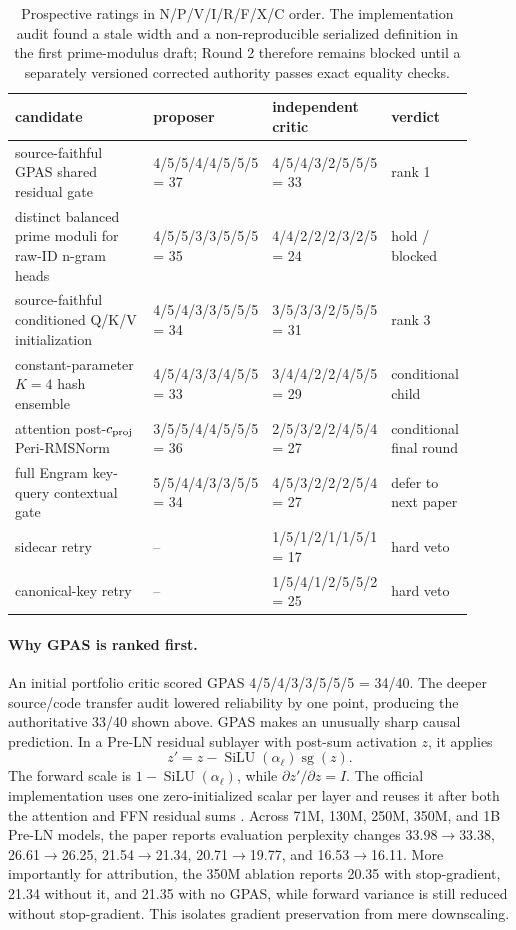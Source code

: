 \documentclass{article}
\newcommand{\sg}{\operatorname{sg}}
\newcommand{\silu}{\operatorname{SiLU}}
\begin{document}
\begin{table}[t]
\caption{Prospective ratings in N/P/V/I/R/F/X/C order.  The implementation
audit found a stale width and a non-reproducible serialized definition in the
first prime-modulus draft; Round 2 therefore remains blocked until a separately
versioned corrected authority passes exact equality checks.}
\label{tab:ratings}
\centering\scriptsize
\setlength{\tabcolsep}{3.6pt}
\begin{tabular}{p{0.31\linewidth}p{0.21\linewidth}p{0.21\linewidth}p{0.18\linewidth}}
\toprule
candidate & proposer & independent critic & verdict\\
\midrule
source-faithful GPAS shared residual gate &
4/5/5/4/4/5/5/5 = 37 &
4/5/4/3/2/5/5/5 = 33 & rank 1\\
distinct balanced prime moduli for raw-ID n-gram heads &
4/5/5/3/3/5/5/5 = 35 &
4/4/2/2/2/3/2/5 = 24 & hold / blocked\\
source-faithful conditioned Q/K/V initialization &
4/5/4/3/3/5/5/5 = 34 &
3/5/3/3/2/5/5/5 = 31 & rank 3\\
constant-parameter $K=4$ hash ensemble &
4/5/4/3/3/4/5/5 = 33 &
3/4/4/2/2/4/5/5 = 29 & conditional child\\
attention post-$c_{\rm proj}$ Peri-RMSNorm &
3/5/5/4/4/5/5/5 = 36 &
2/5/3/2/2/4/5/4 = 27 & conditional final round\\
full Engram key-query contextual gate &
5/5/4/4/3/3/5/5 = 34 &
4/5/3/2/2/2/5/4 = 27 & defer to next paper\\
sidecar retry &
-- &
1/5/1/2/1/1/5/1 = 17 & hard veto\\
canonical-key retry &
-- &
1/5/4/1/2/5/5/2 = 25 & hard veto\\
\bottomrule
\end{tabular}
\end{table}

\paragraph{Why GPAS is ranked first.}
An initial portfolio critic scored GPAS
4/5/4/3/3/5/5/5 = 34/40.  The deeper source/code transfer audit lowered
reliability by one point, producing the authoritative 33/40 shown above.
GPAS makes an unusually sharp causal prediction.  In a Pre-LN residual
sublayer with post-sum activation $z$, it applies
\[
z' = z-\silu(\alpha_\ell)\sg(z).
\]
The forward scale is $1-\silu(\alpha_\ell)$, while
$\partial z'/\partial z=I$.  The official implementation uses one
zero-initialized scalar per layer and reuses it after both the attention and
FFN residual sums \cite{gpas2025,gpascode}.  Across 71M, 130M, 250M, 350M,
and 1B Pre-LN models, the paper reports evaluation perplexity changes
33.98$\rightarrow$33.38, 26.61$\rightarrow$26.25,
21.54$\rightarrow$21.34, 20.71$\rightarrow$19.77, and
16.53$\rightarrow$16.11.  More importantly for attribution, the 350M
ablation reports 20.35 with stop-gradient, 21.34 without it, and 21.35 with no
GPAS, while forward variance is still reduced without stop-gradient.
This isolates gradient preservation from mere downscaling.
\end{document}
